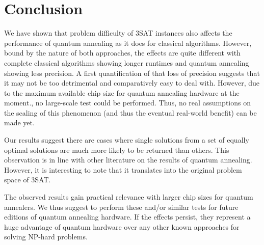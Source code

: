 \section{Conclusion}
\label{sec:conclusion}


We have shown that problem difficulty of 3SAT instances also affects the performance of quantum annealing as it does for classical algorithms. However, bound by the nature of both approaches, the effects are quite different with complete classical algorithms showing longer runtimes and quantum annealing showing less precision. A first quantification of that loss of precision suggests that it may not be too detrimental and comparatively easy to deal with. However, due to the maximum available chip size for quantum annealing hardware at the moment., no large-scale test could be performed. Thus, no real assumptions on the scaling of this phenomenon (and thus the eventual real-world benefit) can be made yet.

Our results suggest there are cases where single solutions from a set of equally optimal solutions are much more likely to be returned than others. This observation is in line with other literature on the results of quantum annealing. However, it is interesting to note that it translates into the original problem space of 3SAT.

The observed results gain practical relevance with larger chip sizes for quantum annealers. We thus suggest to perform these and/or similar tests for future editions of quantum annealing hardware. If the effects persist, they represent a huge advantage of quantum hardware over any other known approaches for solving NP-hard problems.
